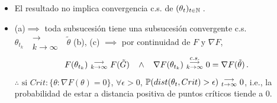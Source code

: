 \begin{remark}
\beforeitemize
\begin{itemize}
    \item El resultado no implica convergencia c.s. de $(\theta_t)_{t\in\N}$\,.
    \item (a)$\implies$ toda subsucesión tiene una subsucesión convergente c.s. $\theta_{t_k}\mbox{ }\substack{\longrightarrow \\ k\to\infty}\mbox{ } \tilde{\theta}$
    \newline (b), (c) $\implies$ por continuidad de $F$ y $\nabla F$,
    $$F(\theta_{t_k})\mbox{ }\substack{\longrightarrow \\ k\to\infty}\mbox{ }F(\tilde{G})\espacio\land\espacio \nabla F(\theta_{t_k})\mbox{ }\overset{c.s.}{\substack{\longrightarrow \\k \to \infty}}\mbox{ }0=\nabla F(\tilde{\theta})\,.$$
    \newline $\therefore\mbox{ si }Crit:\{\theta:\nabla F(\theta)=0\}$, $\forall \epsilon>0$, $\P(dist(\theta_t,Crit)>\epsilon)\mbox{ }\substack{\longrightarrow \\ t\to\infty}\mbox{ }0$\espacio, i.e., la probabilidad de estar a distancia positiva de puntos críticos tiende a $0$.
\end{itemize}
\end{remark}
\vspace{.75cm}\\
